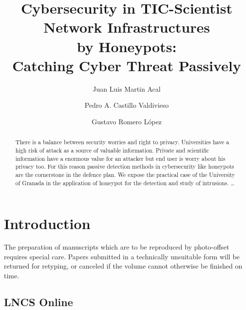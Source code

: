 \documentclass[a4paper]{llncs}
\begin{document}
\pagestyle{empty}

\mainmatter

\title{Cybersecurity in TIC-Scientist Network Infrastructures\\by Honeypots:\\Catching Cyber Threat Passively}


\author{Juan Luis Martin Acal \and Pedro A. Castillo Valdivieso
\and Gustavo Romero López}



\maketitle

\begin{abstract}
There is a balance between security worries and right to privacy. Universities have a high risk of attack as a source of valuable information. Private and scientific information have a enormous value for an attacker but end user is worry about his privacy too. For this reason passive detection methods in cybersecurity like honeypots are the cornerstone in the defence plan. We expose the practical case of the University of Granada in the application of honeypot for the detection and study of intrusions.
\dots
\end{abstract}


\section{Introduction}

The preparation of manuscripts which are to be reproduced by
photo-offset requires special care. Papers submitted in a
technically unsuitable form will be returned for retyping, or canceled
if the volume cannot otherwise be finished on time.

\subsection{LNCS Online}
\label{sect:lncs_online}
\end{document}
